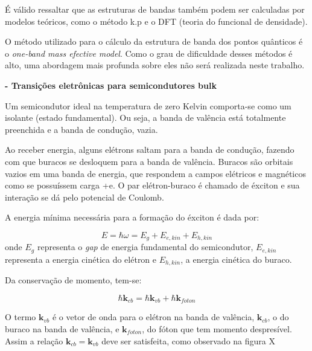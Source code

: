 		\par É válido ressaltar que  as estruturas de bandas também podem ser calculadas por modelos teóricos, como o método k.p e o DFT (teoria do funcional de densidade).

		\par O método utilizado para o cálculo da estrutura de banda dos pontos quânticos é o \textit{one-band mass efective model}\cite{bulk2}. Como o  grau de dificuldade desses métodos é alto, uma abordagem mais profunda sobre eles não será realizada neste trabalho.

	\par \textbf{- Transições eletrônicas para semicondutores bulk}

		\par Um semicondutor ideal na temperatura de zero Kelvin comporta-se como um isolante (estado fundamental). Ou seja, a banda de valência está totalmente preenchida e a banda de condução, vazia.
 		
 		\par Ao receber energia, alguns elétrons saltam para a banda de condução, fazendo com que buracos se desloquem para a banda de valência\cite{bloch1}. Buracos são orbitais vazios em uma banda de energia, que respondem a campos elétricos e magnéticos como se possuíssem carga +e\cite{qm_fis6}. O par elétron-buraco é chamado de éxciton e sua interação se dá pelo potencial de Coulomb\cite{bloch1}.

 		\par A energia mínima necessária para a formação do éxciton é dada por:

 		\begin{equation}
 			\label{bandas_1}
 			E = \hbar \omega = E_{g} + E_{e, kin} + E_{h, kin}
 		\end{equation}
 		onde $E_{g}$ representa o \textit{gap} de energia fundamental do semicondutor, $E_{e,kin}$ representa a energia cinética do elétron e $E_{h,kin}$, a energia cinética do buraco.

 		\par Da conservação de momento, tem-se:

 		\begin{equation}
 			\label{bandas_2}
 			\hbar \mathbf{k}_{cb} = \hbar \mathbf{k}_{vb} + \hbar \mathbf{k}_{foton}
 		\end{equation}

 		\par O termo $\mathbf{k}_{vb}$ é o vetor de onda para o elétron na banda de valência, $\mathbf{k}_{cb}$, o do buraco na banda de valência, e $\mathbf{k}_{foton}$, do fóton que tem momento despresível. Assim a relação $\mathbf{k}_{cb} = \mathbf{k}_{vb}$ deve ser satisfeita, como observado na figura X

